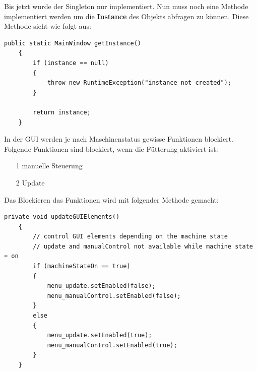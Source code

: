 Bis jetzt wurde der Singleton nur implementiert. Nun muss noch eine Methode implementiert werden um die \textbf{Instance} des Objekts abfragen zu können. Diese Methode sieht wie folgt aus:
\begin{lstlisting}[style=JavaStyle, caption=MainWindow.getInstance()]
public static MainWindow getInstance()
    {
        if (instance == null)
        {
            throw new RuntimeException("instance not created");
        }

        return instance;
    }
\end{lstlisting}

\vspace{10pt}

In der GUI werden je nach Maschinenstatus gewisse Funktionen blockiert. Folgende Funktionen sind blockiert, wenn die Fütterung aktiviert ist:
\begin{itemize}
\item[1] manuelle Steuerung
\item[2] Update
\end{itemize}
Das Blockieren das Funktionen wird mit folgender Methode gemacht:
\begin{lstlisting}[style=JavaStyle, caption=GUI Elemente blockieren]
private void updateGUIElements()
    {
        // control GUI elements depending on the machine state
        // update and manualControl not available while machine state = on 
        if (machineStateOn == true)
        {
            menu_update.setEnabled(false);
            menu_manualControl.setEnabled(false);
        }
        else
        {
            menu_update.setEnabled(true);
            menu_manualControl.setEnabled(true);
        }
    }
\end{lstlisting}

\newpage


